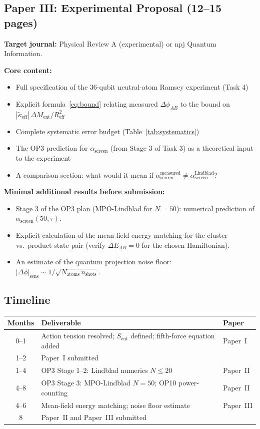 \documentclass[12pt,letterpaper]{article}
\theoremstyle{plain}
\theoremstyle{definition}
\theoremstyle{remark}
\newcommand{\kteff}{\tilde{\kappa}_{\mathrm{eff}}}
\newcommand{\Sent}{S_{\mathrm{ent}}}
\newcommand{\Ment}{M_{\mathrm{ent}}}
\newcommand{\asc}{\alpha_{\mathrm{screen}}}
\begin{document}
\subsection{Paper III: Experimental Proposal (12--15 pages)}

\textbf{Target journal:} Physical Review A (experimental) or npj Quantum Information.

\textbf{Core content:}
\begin{itemize}
\item Full specification of the 36-qubit neutral-atom Ramsey experiment (Task 4)
\item Explicit formula~\eqref{eq:bound} relating measured $\Delta\phi_{AB}$ to the bound on $|\kteff|\,\Delta\Ment/R_{\mathrm{eff}}^2$
\item Complete systematic error budget (Table~\ref{tab:systematics})
\item The OP3 prediction for $\asc$ (from Stage 3 of Task 3) as a theoretical input to the experiment
\item A comparison section: what would it mean if $\asc^{\mathrm{measured}} \neq \asc^{\mathrm{Lindblad}}$?
\end{itemize}

\textbf{Minimal additional results before submission:}
\begin{itemize}
\item Stage 3 of the OP3 plan (MPO-Lindblad for $N = 50$): numerical prediction of $\asc(50,\tau)$.
\item Explicit calculation of the mean-field energy matching for the cluster vs.\ product state pair (verify $\Delta E_{AB} = 0$ for the chosen Hamiltonian).
\item An estimate of the quantum projection noise floor: $|\Delta\phi|_{\mathrm{sens}} \sim 1/\sqrt{N_{\mathrm{atoms}}\,n_{\mathrm{shots}}}$.
\end{itemize}

\subsection{Timeline}

\begin{center}\small
\begin{tabular}{@{}cll@{}}
\toprule
Months & Deliverable & Paper \\
\midrule
0--1  & Action tension resolved; $\Sent$ defined; fifth-force equation added & Paper~I \\
1--2  & Paper~I submitted & \\
1--4  & OP3 Stage 1--2: Lindblad numerics $N \leq 20$ & Paper~II \\
4--8  & OP3 Stage 3: MPO-Lindblad $N = 50$; OP10 power-counting & Paper~II \\
4--6  & Mean-field energy matching; noise floor estimate & Paper~III \\
8     & Paper~II and Paper~III submitted & \\
\bottomrule
\end{tabular}
\end{center}
\end{document}
